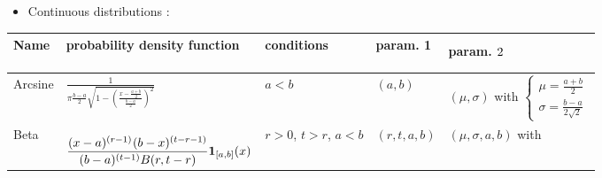 \begin{itemize}
\item Continuous distributions :
\end{itemize}

{\footnotesize
  \noindent \begin{tabular}{|p{1.8cm}|p{6.0cm}|p{2.7cm}|p{1.7cm}|p{4.6cm}|}
    \hline
    Name & probability density function & conditions & param. 1 & param. $2^{\strut}_{\strut}$\\
    \hline
    Arcsine & $\frac{1}{\pi \frac{b-a}{2} \sqrt{1-\left(\frac{x-\frac{a+b}{2}}{\frac{b-a}{2}}\right)^{2}}}$ & $a <b$& $(a, b)$ & $(\mu, \sigma)$ with
    $
    \left\{
      \begin{array}{l}
        \mu = \frac{a+b}{2} \\
        \sigma = \frac{b-a}{2\sqrt{2}}
      \end{array}
    \right.
    $ \\
    \hline
    Beta & $\displaystyle  \frac{(x-a)^{(r-1)^{\strut}}(b-x)^{(t-r-1)}}{(b-a)^{(t-1)}B(r,t-r)}\boldsymbol{1}_{[a,b]}(x)$  & $r>0$, $t>r$, $a < b$ & $(r, t, a, b)$ & $(\mu, \sigma, a,b)$ with


\end{tabular}}
